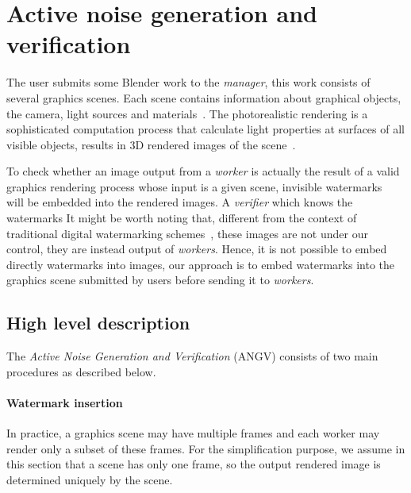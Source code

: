 
\section[Active noise generation and verification]{Active noise generation and verification}
The user submits some Blender work to the \emph{manager}, this work consists of several graphics scenes. Each scene contains information about graphical objects, the camera, light sources and materials~\cite{Blender}. The photorealistic rendering is a sophisticated computation process that calculate light properties at surfaces of all visible objects, results in 3D rendered images of the scene~\cite{Hughes2014}.

To check whether an image output from a \emph{worker} is actually the result of a valid graphics rendering process whose input is a given scene, invisible watermarks~\cite{Craver1997} will be embedded into the rendered images. A \emph{verifier} which knows the watermarks  It might be worth noting that, different from the context of traditional digital watermarking schemes~\cite{Cox2008}, these images are not under our control, they are instead output of \emph{workers}. Hence, it is not possible to embed directly watermarks into images, our approach is to embed watermarks into the graphics scene submitted by users before sending it to \emph{workers}.

\subsection[Hight level description]{High level description}
The \emph{Active Noise Generation and Verification} (ANGV) consists of two main procedures as described below.

\paragraph[Watermark insertion]{Watermark insertion}
In practice, a graphics scene may have multiple frames and each worker may render only a subset of these frames. For the simplification purpose, we assume in this section that a scene has only one frame, so the output rendered image is determined uniquely by the scene.

